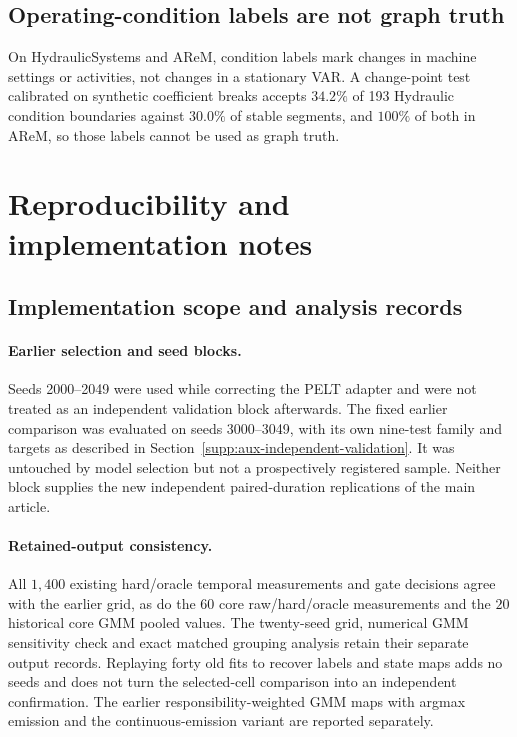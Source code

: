 \documentclass[11pt]{article}
\begin{document}
\FloatBarrier
\subsection{Operating-condition labels are not graph truth}
\label{supp:operating-targets}
On HydraulicSystems and AReM, condition labels mark changes in machine settings
or activities, not changes in a stationary VAR. A change-point test calibrated on
synthetic coefficient breaks accepts $34.2\%$ of 193 Hydraulic condition
boundaries against $30.0\%$ of stable segments, and $100\%$ of both in AReM, so
those labels cannot be used as graph truth.

\FloatBarrier
\section{Reproducibility and implementation notes}
\label{supp:implementation}

\subsection{Implementation scope and analysis records}
\label{app:provenance}

\paragraph{Earlier selection and seed blocks.}
Seeds 2000--2049 were used while correcting the PELT adapter and were not treated
as an independent validation block afterwards. The fixed earlier comparison was evaluated
on seeds 3000--3049, with its own nine-test family and targets as described in
Section~\ref{supp:aux-independent-validation}. It was untouched by model selection but not a
prospectively registered sample. Neither block supplies the new independent
paired-duration replications of the main article.

\paragraph{Retained-output consistency.}
All $1{,}400$ existing hard/oracle temporal measurements and gate decisions agree
with the earlier grid, as do the $60$ core raw/hard/oracle measurements and the
$20$ historical core GMM pooled values.
The twenty-seed grid, numerical GMM sensitivity check and exact matched
grouping analysis retain their separate output records. Replaying forty old
fits to recover labels and state maps adds no seeds and does not turn the
selected-cell comparison into an independent confirmation. The earlier
responsibility-weighted GMM maps with argmax emission and the continuous-emission
variant are reported separately.
\end{document}
